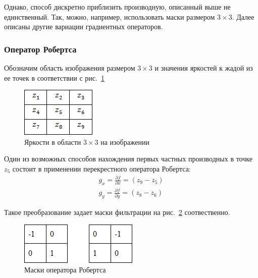 \documentclass[12pt]{article} %
\begin{document}
Однако, способ дискретно приблизить производную, описанный выше не единственный. Так, можно, например, использовать маски размером $3\times3$. Далее описаны другие вариации градиентных операторов.

\subsubsection{Оператор Робертса}

Обозначим область изображения размером $3\times 3$ и значения яркостей к жадой из ее точек в соответствии с рис.~\ref{fig:grad_mask_3}

\begin{figure}[h]
	
	\centering
	
	\includegraphics[width=0.2\linewidth]{grad_mask_3.jpg}
	
	\caption{Яркости в области $3\times3$ на изображении}
	
	\label{fig:grad_mask_3}
	
\end{figure}

Один из возможных способов нахождения первых частных производных в точке~$z_5$ состоит в применении перекрестного оператора Робертса:
\begin{gather}\label{grad_mask_3}
	g_x = \frac{\partial f}{\partial x} = (z_9-z_5)\\
	g_y = \frac{\partial f}{\partial y} = (z_8-z_6)
\end{gather}

Такое преобразование задает маски фильтрации на рис.~\ref{fig:grad_mask_rob} соотвественно.

\begin{figure}[h]
	
	\centering
	
	\includegraphics[width=0.25\linewidth]{grad_mask_rob.jpg}
	
	\caption{Маски оператора Робертса}
	
	\label{fig:grad_mask_rob}
	
\end{figure}
\end{document}
